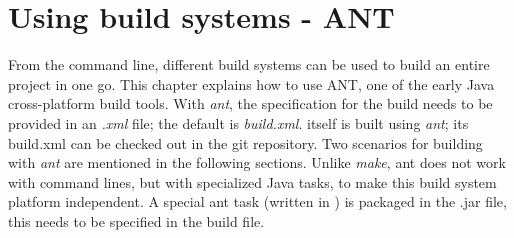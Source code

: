 





\chapter{Using build systems - ANT}

From the command line, different build systems can be used to build an
entire project in one go. This chapter explains how to use ANT, one of
the early Java cross-platform build tools. With \emph{ant}, the
specification for the build needs to be provided in an \emph{.xml} file; the
default is \emph{build.xml}. \nr{} itself is built using \emph{ant};
its build.xml can be checked out in the git repository. Two scenarios
for building with \emph{ant} are mentioned in the
following sections. Unlike \emph{make}, ant does not work with command
lines, but with specialized Java tasks, to make this build system
platform independent. A special \nr{} ant task (written in \nr{}) is packaged in the
\nr{}.jar file, this needs to be specified in the build file.

